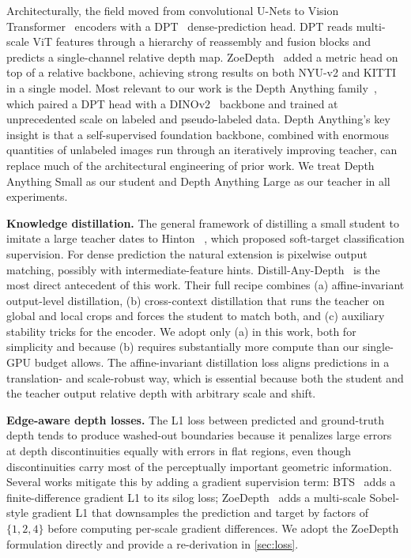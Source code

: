 \documentclass[10pt,twocolumn,letterpaper]{article}
\begin{document}
Architecturally, the field moved from convolutional U-Nets to Vision
Transformer~\cite{dosovitskiy2021vit} encoders with a DPT~\cite{ranftl2021dpt}
dense-prediction head. DPT reads multi-scale ViT features through a
hierarchy of reassembly and fusion blocks and predicts a single-channel
relative depth map. ZoeDepth~\cite{bhat2023zoedepth} added a metric head
on top of a relative backbone, achieving strong results on both NYU-v2
and KITTI in a single model. Most relevant to our work is the Depth
Anything family~\cite{yang2024depth,yang2024depthv2}, which paired a DPT
head with a DINOv2~\cite{oquab2023dinov2} backbone and trained at
unprecedented scale on labeled and pseudo-labeled data. Depth Anything's
key insight is that a self-supervised foundation backbone, combined with
enormous quantities of unlabeled images run through an iteratively
improving teacher, can replace much of the architectural engineering of
prior work. We treat Depth Anything Small as our student and Depth
Anything Large as our teacher in all experiments.

\textbf{Knowledge distillation.} The general framework of distilling a
small student to imitate a large teacher dates to
Hinton \etal~\cite{hinton2015distilling}, which proposed soft-target
classification supervision. For dense prediction the natural extension
is pixelwise output matching, possibly with intermediate-feature
hints. Distill-Any-Depth~\cite{he2025distillanydepth} is the most direct
antecedent of this work. Their full recipe combines (a) affine-invariant
output-level distillation, (b) cross-context distillation that runs the
teacher on global and local crops and forces the student to match both,
and (c) auxiliary stability tricks for the encoder. We adopt only (a)
in this work, both for simplicity and because (b) requires substantially
more compute than our single-GPU budget allows. The affine-invariant
distillation loss aligns predictions in a translation- and scale-robust
way, which is essential because both the student and the teacher output
relative depth with arbitrary scale and shift.

\textbf{Edge-aware depth losses.} The L1 loss between predicted and
ground-truth depth tends to produce washed-out boundaries because it
penalizes large errors at depth discontinuities equally with errors in
flat regions, even though discontinuities carry most of the perceptually
important geometric information. Several works mitigate this by adding a
gradient supervision term: BTS~\cite{lee2019bts} adds a finite-difference
gradient L1 to its silog loss; ZoeDepth~\cite{bhat2023zoedepth} adds a
multi-scale Sobel-style gradient L1 that downsamples the prediction and
target by factors of $\{1,2,4\}$ before computing per-scale gradient
differences. We adopt the ZoeDepth formulation directly and provide a
re-derivation in \cref{sec:loss}.
\end{document}
